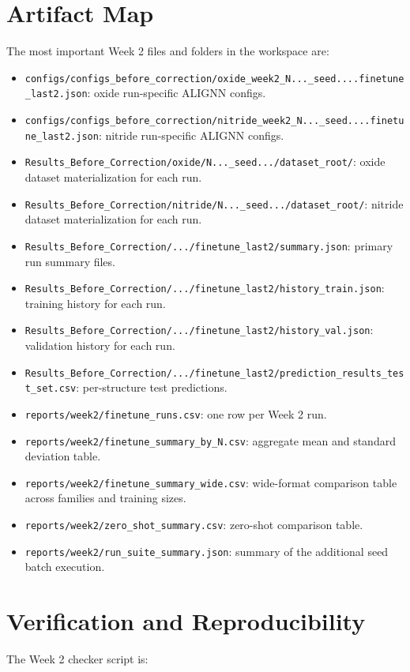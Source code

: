 \documentclass[11pt]{article}
\begin{document}
\section{Artifact Map}
The most important Week 2 files and folders in the workspace are:
\begin{itemize}
  \item \texttt{configs/configs\_before\_correction/oxide\_week2\_N...\_seed....finetune\_last2.json}: oxide run-specific ALIGNN configs.
  \item \texttt{configs/configs\_before\_correction/nitride\_week2\_N...\_seed....finetune\_last2.json}: nitride run-specific ALIGNN configs.
  \item \texttt{Results_Before_Correction/oxide/N...\_seed.../dataset\_root/}: oxide dataset materialization for each run.
  \item \texttt{Results_Before_Correction/nitride/N...\_seed.../dataset\_root/}: nitride dataset materialization for each run.
  \item \texttt{Results_Before_Correction/.../finetune\_last2/summary.json}: primary run summary files.
  \item \texttt{Results_Before_Correction/.../finetune\_last2/history\_train.json}: training history for each run.
  \item \texttt{Results_Before_Correction/.../finetune\_last2/history\_val.json}: validation history for each run.
  \item \texttt{Results_Before_Correction/.../finetune\_last2/prediction\_results\_test\_set.csv}: per-structure test predictions.
  \item \texttt{reports/week2/finetune\_runs.csv}: one row per Week 2 run.
  \item \texttt{reports/week2/finetune\_summary\_by\_N.csv}: aggregate mean and standard deviation table.
  \item \texttt{reports/week2/finetune\_summary\_wide.csv}: wide-format comparison table across families and training sizes.
  \item \texttt{reports/week2/zero\_shot\_summary.csv}: zero-shot comparison table.
  \item \texttt{reports/week2/run\_suite\_summary.json}: summary of the additional seed batch execution.
\end{itemize}

\section{Verification and Reproducibility}
The Week 2 checker script is:
\end{document}
